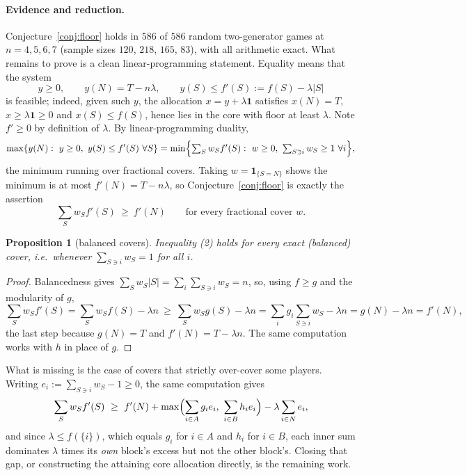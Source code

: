 \documentclass[11pt]{article}
\newtheorem{proposition}[theorem]{Proposition}
\newcommand{\one}{\mathbf 1}
\begin{document}
\paragraph{Evidence and reduction.}
Conjecture~\ref{conj:floor} holds in $586$ of $586$ random two-generator
games at $n=4,5,6,7$ (sample sizes $120$, $218$, $165$, $83$), with all
arithmetic exact.  What remains to prove is a clean linear-programming
statement.  Equality means that the system
\[
 y\ge0,\qquad y(N)=T-n\lambda,\qquad y(S)\le f'(S):=f(S)-\lambda|S|
\]
is feasible; indeed, given such $y$, the allocation $x=y+\lambda\one$
satisfies $x(N)=T$, $x\ge\lambda\one\ge0$ and $x(S)\le f(S)$, hence lies in
the core with floor at least $\lambda$.  Note $f'\ge0$ by definition of
$\lambda$.  By linear-programming duality,
\[
 \max\{y(N):\ y\ge0,\ y(S)\le f'(S)\ \forall S\}
 =\min\Bigl\{\textstyle\sum_S w_Sf'(S):\ w\ge0,\ \sum_{S\ni i}w_S\ge1\ \forall i\Bigr\},
\]
the minimum running over fractional covers.  Taking $w=\one_{\{S=N\}}$ shows
the minimum is at most $f'(N)=T-n\lambda$, so Conjecture~\ref{conj:floor} is
exactly the assertion
\[
 \sum_S w_Sf'(S)\ \ge\ f'(N)\qquad\text{for every fractional cover }w. \tag{2}
\]

\begin{proposition}[balanced covers]\label{prop:balanced}
Inequality (2) holds for every exact (balanced) cover, i.e.\ whenever
$\sum_{S\ni i}w_S=1$ for all $i$.
\end{proposition}

\begin{proof}
Balancedness gives $\sum_Sw_S|S|=\sum_i\sum_{S\ni i}w_S=n$, so, using
$f\ge g$ and the modularity of $g$,
\[
 \sum_Sw_Sf'(S)=\sum_Sw_Sf(S)-\lambda n
 \ \ge\ \sum_Sw_Sg(S)-\lambda n
 =\sum_i g_i\sum_{S\ni i}w_S-\lambda n
 =g(N)-\lambda n=f'(N),
\]
the last step because $g(N)=T$ and $f'(N)=T-\lambda n$.
The same computation works with $h$ in place of $g$.
\end{proof}

What is missing is the case of covers that strictly over-cover some players.
Writing $e_i:=\sum_{S\ni i}w_S-1\ge0$, the same computation gives
\[
 \sum_Sw_Sf'(S)\ \ge\ f'(N)
 +\max\Bigl(\sum_{i\in A}g_ie_i,\ \sum_{i\in B}h_ie_i\Bigr)
 -\lambda\sum_{i\in N}e_i,
\]
and since $\lambda\le f(\{i\})$, which equals $g_i$ for $i\in A$ and $h_i$
for $i\in B$, each inner sum dominates $\lambda$ times its \emph{own} block's
excess but not the other block's.  Closing that gap, or constructing the
attaining core allocation directly, is the remaining work.
\end{document}
